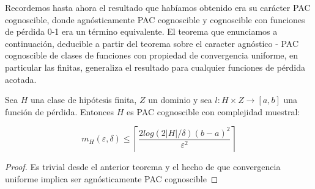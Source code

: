 Recordemos hasta ahora el resultado que habíamos obtenido era su carácter PAC cognoscible, donde 
agnósticamente PAC cognoscible y cognoscible con funciones de pérdida 0-1 era un término equivalente. El 
teorema que enunciamos a continuación, deducible a partir del teorema sobre el caracter agnóstico - PAC 
cognoscible de clases de funciones con propiedad de convergencia uniforme, en particular las finitas, 
generaliza el resultado para cualquier funciones de pérdida acotada.

\begin{theorem*}

Sea $H$ una clase de hipótesis finita, $Z$ un dominio y sea $l : H \times Z \rightarrow [a,b]$ una función de pérdida. Entonces $H$ es PAC cognoscible con complejidad muestral:

\[m_{H}( \varepsilon, \delta ) \le \left\lceil \frac{2 log(2|H|/\delta)(b-a)^2}{\varepsilon^2} \right\rceil\]
\end{theorem*}
  \begin{proof}
  Es trivial desde el anterior teorema y el hecho de que convergencia uniforme implica ser agnósticamente PAC cognoscible
  \end{proof}
